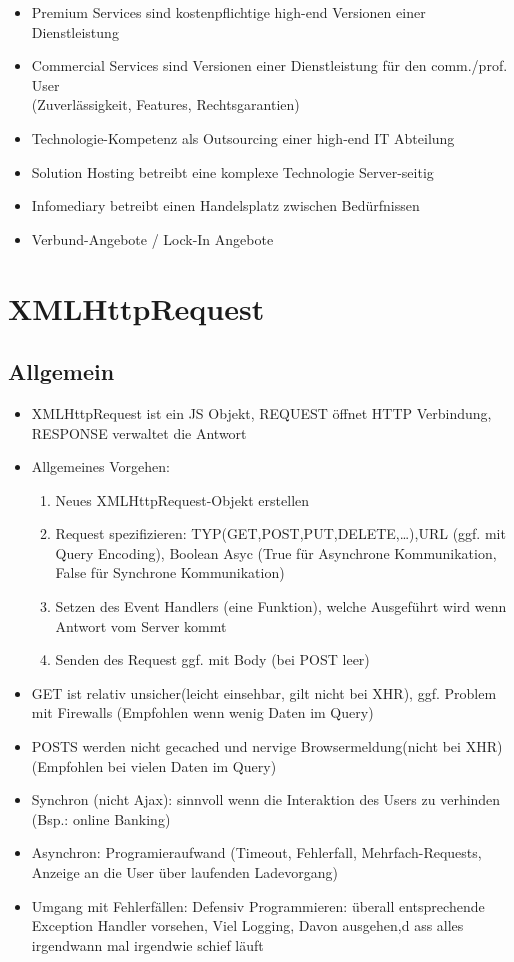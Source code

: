 \documentclass{article} %
\begin{document}
			\begin{itemize}
				\item Premium Services sind kostenpflichtige high-end Versionen einer Dienstleistung
				\item Commercial Services sind Versionen einer Dienstleistung für den comm./prof. User\\
				(Zuverlässigkeit, Features, Rechtsgarantien)
				\item Technologie-Kompetenz als Outsourcing einer high-end IT Abteilung
				\item Solution Hosting betreibt eine komplexe Technologie Server-seitig
				\item Infomediary betreibt einen Handelsplatz zwischen Bedürfnissen
				\item Verbund-Angebote / Lock-In Angebote
			\end{itemize}
			
						
	\section{XMLHttpRequest}
	\subsection{Allgemein}
	\begin{itemize}
		\item XMLHttpRequest ist ein JS Objekt, REQUEST öffnet HTTP Verbindung, RESPONSE verwaltet die Antwort
		\item Allgemeines Vorgehen:
		\begin{enumerate}
			\item Neues XMLHttpRequest-Objekt erstellen
			\item Request spezifizieren: TYP(GET,POST,PUT,DELETE,\dots),URL (ggf. mit Query Encoding), Boolean Asyc (True für Asynchrone Kommunikation, False für Synchrone Kommunikation)
			\item Setzen des Event Handlers (eine Funktion), welche Ausgeführt wird wenn Antwort vom Server kommt
			\item Senden des Request ggf. mit Body (bei POST leer)
		\end{enumerate}
		\item GET ist relativ unsicher(leicht einsehbar, gilt nicht bei XHR), ggf. Problem mit Firewalls (Empfohlen wenn wenig Daten im Query)
		\item POSTS werden nicht gecached und nervige Browsermeldung(nicht bei XHR) (Empfohlen bei vielen Daten im Query)
		\item Synchron (nicht Ajax): sinnvoll wenn die Interaktion des Users zu verhinden (Bsp.: online Banking)
		\item Asynchron: Programieraufwand (Timeout, Fehlerfall, Mehrfach-Requests, Anzeige an die User über laufenden Ladevorgang)
		\item Umgang mit Fehlerfällen: Defensiv Programmieren: überall entsprechende Exception Handler vorsehen, Viel Logging, Davon ausgehen,d ass alles irgendwann mal irgendwie schief läuft
	\end{itemize}
			
\end{document}
